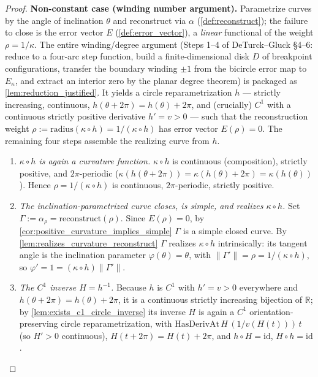 \begin{proof}
  \textbf{Non-constant case (winding number argument).} Parametrize curves by the
  angle of inclination $\theta$ and reconstruct via $\alpha$
  (\cref{def:reconstruct}); the failure to close is the error vector $E$
  (\cref{def:error_vector}), a \emph{linear} functional of the weight
  $\rho = 1/\kappa$. The entire winding/degree argument (Steps 1--4 of
  DeTurck--Gluck §4--6: reduce to a four-arc step function, build a
  finite-dimensional disk $D$ of breakpoint configurations, transfer the boundary
  winding $\pm1$ from the bicircle error map to $E_\kappa$, and extract an interior
  zero by the planar degree theorem) is packaged as
  \cref{lem:reduction_justified}. It yields a circle reparametrization $h$ ---
  strictly increasing, continuous, $h(\theta+2\pi)=h(\theta)+2\pi$, and (crucially)
  $C^1$ with a continuous strictly positive derivative $h'=v>0$ --- such that the
  reconstruction weight $\rho := \mathrm{radius}(\kappa\circ h) = 1/(\kappa\circ h)$
  has error vector $E(\rho)=0$. The remaining four steps assemble the realizing
  curve from $h$.
  \begin{enumerate}
    \item \emph{$\kappa\circ h$ is again a curvature function.} $\kappa\circ h$ is
      continuous (composition), strictly positive, and $2\pi$-periodic
      ($\kappa(h(\theta+2\pi))=\kappa(h(\theta)+2\pi)=\kappa(h(\theta))$). Hence
      $\rho=1/(\kappa\circ h)$ is continuous, $2\pi$-periodic, strictly positive.
    \item \emph{The inclination-parametrized curve closes, is simple, and realizes
      $\kappa\circ h$.} Set $\Gamma := \alpha_\rho = \mathrm{reconstruct}(\rho)$.
      Since $E(\rho)=0$, by \cref{cor:positive_curvature_implies_simple} $\Gamma$ is
      a simple closed curve. By \cref{lem:realizes_curvature_reconstruct} $\Gamma$
      realizes $\kappa\circ h$ intrinsically: its tangent angle is the inclination
      parameter $\varphi(\theta)=\theta$, with $\lVert\Gamma'\rVert=\rho=
      1/(\kappa\circ h)$, so $\varphi'=1=(\kappa\circ h)\lVert\Gamma'\rVert$.
    \item \emph{The $C^1$ inverse $H=h^{-1}$.} Because $h$ is $C^1$ with $h'=v>0$
      everywhere and $h(\theta+2\pi)=h(\theta)+2\pi$, it is a continuous strictly
      increasing bijection of $\mathbb{R}$; by
      \cref{lem:exists_c1_circle_inverse} its inverse $H$ is again a $C^1$
      orientation-preserving circle reparametrization, with $\mathrm{HasDerivAt}\,
      H\,(1/v(H(t)))\,t$ (so $H'>0$ continuous), $H(t+2\pi)=H(t)+2\pi$, and
      $h\circ H=\mathrm{id}$, $H\circ h=\mathrm{id}$.

\end{enumerate}
\end{proof}
